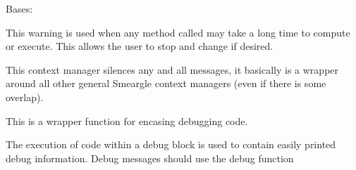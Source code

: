 \documentclass[letterpaper,10pt,english]{sphinxmanual}
\begin{document}

\begin{fulllineitems}
\label{\detokenize{python_docstrings/IfA_Smeargle.meta.errors:IfA_Smeargle.meta.errors.TimeWarning}}
Bases: {\hyperref[\detokenize{python_docstrings/IfA_Smeargle.meta.errors:IfA_Smeargle.meta.errors.Smeargle_Warning}]{}}

This warning is used when any method called may take a long time to
compute or execute. This allows the user to stop and change if desired.

\end{fulllineitems}


\begin{fulllineitems}
\label{\detokenize{python_docstrings/IfA_Smeargle.meta.errors:IfA_Smeargle.meta.errors.smeargle_absolute_silence}}
This context manager silences any and all messages, it basically
is a wrapper around all other general Smeargle context managers (even
if there is some overlap).

\end{fulllineitems}


\begin{fulllineitems}
\label{\detokenize{python_docstrings/IfA_Smeargle.meta.errors:IfA_Smeargle.meta.errors.smeargle_debug_block}}
This is a wrapper function for encasing debugging code.

The execution of code within a debug block is used to contain easily
printed debug information. Debug messages should use the debug function
{\hyperref[\detokenize{python_docstrings/IfA_Smeargle.meta.errors:IfA_Smeargle.meta.errors.smeargle_debug_message}]{}}

\end{fulllineitems}
\end{document}
